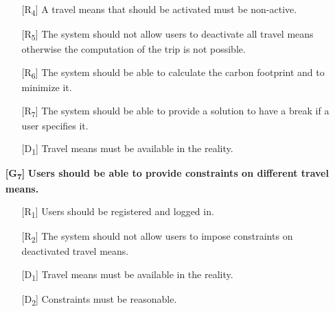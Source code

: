 \documentclass[12pt,titlepage]{article}
\begin{document}
\begin{itemize}
\begin{itemize}
\item[{[R\textsubscript{4}]}] A travel means that should be activated must be non-active.
\item[{[R\textsubscript{5}]}]  The system should not allow users to deactivate all travel means otherwise the computation of the trip is not possible.
\item[{[R\textsubscript{6}]}]  The system should be able to calculate the carbon footprint and to minimize it.
\item[{[R\textsubscript{7}]}]  The system should be able to provide a solution to have a break if a user specifies it.
\item[{[D\textsubscript{1}]}] Travel means must be available in the reality.
\end{itemize}
\item[\textbf{ {[G\textsubscript{7}]}	}]	\textbf{Users should be able to provide constraints on different travel means.}
\begin{itemize}
\item[{[R\textsubscript{1}]}]  Users should be registered and logged in.
\item[{[R\textsubscript{2}]}]  The system should not allow users to impose constraints on deactivated travel means.

\item[{[D\textsubscript{1}]}] Travel means must be available in the reality.
\item[{[D\textsubscript{2}]}] Constraints must be reasonable.
\end{itemize}


\end{itemize}
\end{document}
